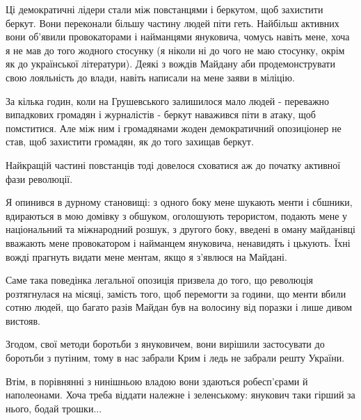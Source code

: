 Ці демократичні лідери стали між повстанцями і беркутом, щоб захистити беркут.
Вони переконали більшу частину людей піти геть. Найбільш активних вони об'явили
провокаторами і найманцями януковича, чомусь навіть мене, хоча я не мав до того
жодного стосунку (я ніколи ні до чого не маю стосунку, окрім як до української
літератури). Деякі з вождів Майдану аби продемонструвати свою лояльність до
влади, навіть написали на мене заяви в міліцію.

За кілька годин, коли на Грушевського залишилося мало людей - переважно
випадкових громадян і журналістів -  беркут наважився піти в атаку, щоб
помститися. Але між ним і громадянами жоден демократичний опозиціонер не став,
щоб захистити громадян, як до того захищав беркут.

Найкращій частині повстанців тоді довелося сховатися аж до початку активної
фази революції.

Я опинився в дурному становищі: з одного боку мене шукають менти і сбшники,
вдираються в мою домівку з обшуком, оголошують терористом, подають мене у
національний та міжнародний розшук, з другого боку, введені в оману майданівці
вважають мене провокатором і найманцем януковича, ненавидять і цькують. Їхні
вожді прагнуть видати мене ментам, якщо я з'явлюся на Майдані.

Саме така поведінка легальної опозиція призвела до того, що революція
розтягнулася на місяці, замість того, щоб перемогти за години, що менти вбили
сотню людей, що багато разів Майдан був на волосину від поразки і лише дивом
вистояв.

Згодом, свої методи боротьби з януковичем, вони вирішили застосувати до
боротьби з путіним, тому в нас забрали Крим і ледь не забрали решту України.

Втім, в порівнянні з нинішньою владою вони здаються робесп'єрами й наполеонами.
Хоча треба віддати належне і зеленському: янукович таки гірший за нього, бодай
трошки...
